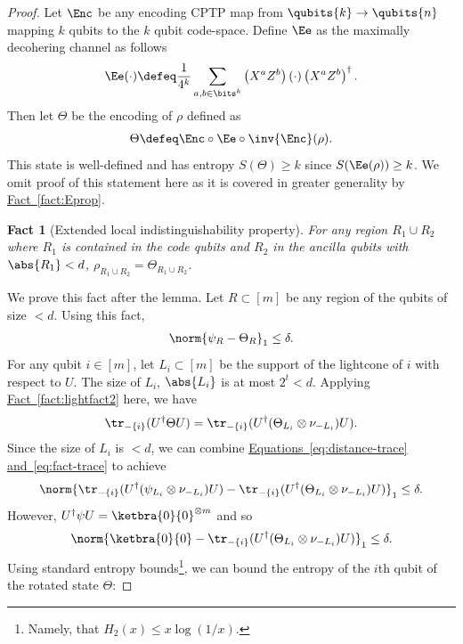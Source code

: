 \documentclass[11pt]{article}
\newcommand{\expref}[2]{\texorpdfstring{\hyperref[#2]{#1~\ref{#2}}}{#1~\ref{#2}}}
\newcommand{\expeqref}[2]{\texorpdfstring{\hyperref[#2]{#1~\eqref{#2}}}{#1~\eqref{#2}}}
\newtheorem{fact}[theorem]{Fact}
\begin{document}
\begin{proof}
Let $\Enc$ be any encoding CPTP map from $\qubits{k} \rightarrow \qubits{n}$ mapping $k$ qubits to the $k$ qubit code-space. Define $\Ee$ as the maximally decohering channel as follows
\begin{align}
\Ee(\cdot) \defeq \frac{1}{4^k} \sum_{a,b \in \bits^k} \left( X^a Z^b \right) (\cdot) \left( X^a Z^b \right)^\dagger.
\end{align}
Then let $\Theta$ be the encoding of $\rho$ defined as
\begin{align}
\label{eq:maxmixcode}
    \Theta \defeq \Enc \circ \Ee \circ \inv{\Enc} (\rho).
\end{align}
This state is well-defined and has entropy $S(\Theta) \geq k$ since $S(\Ee(\rho)) \geq k$. We omit proof of this statement here as it is covered in greater generality by \expref{Fact}{fact:Eprop}.  
\begin{fact}[Extended local indistinguishability property]
\label{fact:extension-of-LI}
For any region $R_1 \cup R_2$ where $R_1$ is contained in the code qubits and $R_2$ in the ancilla qubits with $\abs{R_1} < d$, $\rho_{R_1 \cup R_2} = \Theta_{R_1 \cup R_2}$.
\end{fact}
We prove this fact after the lemma. Let $R \subset [m]$ be any region of the qubits of size $< d$.
%
Using this fact,
\begin{align}
    \norm{\psi_R - \Theta_R}_1 \leq \delta.
    \label{eq:distance-trace}
\end{align}
For any qubit $i \in [m]$, let $L_i \subset [m]$ be the support of the lightcone of $i$ with respect to $U$. The size of $L_i$, $\abs{L_i}$ is at most $2^t < d$. Applying \expref{Fact}{fact:lightfact2} here, we have
\begin{align}
    \label{eq:fact-trace}
    \tr_{-\{i\}}(U^\dagger \Theta U) = \tr_{-\{i\}}(U^\dagger (\Theta_{L_i}\otimes \nu_{-L_i}) U).
\end{align}
Since the size of $L_i$ is $< d$, we can combine \expeqref{Equations}{eq:distance-trace} \expeqref{and}{eq:fact-trace} to achieve
\begin{align}
    \norm{\tr_{-\{i\}}(U^\dagger (\psi_{L_i}\otimes \nu_{-L_i}) U) - \tr_{-\{i\}}(U^\dagger (\Theta_{L_i}\otimes \nu_{-L_i}) U)}_1 \leq \delta.
\end{align}
However, $U^\dagger \psi U = \ketbra{0}{0}^{\otimes m}$ and so
\begin{align}
    \norm{\ketbra{0}{0} - \tr_{-\{i\}}(U^\dagger (\Theta_{L_i}\otimes \nu_{-L_i}) U)}_1 \leq \delta.
\end{align}
Using standard entropy bounds\footnote{Namely, that $H_2(x) \leq x \log(1/x)$.}, we can bound the entropy of the $i$th qubit of the rotated state $\Theta$:

\end{proof}
\end{document}
